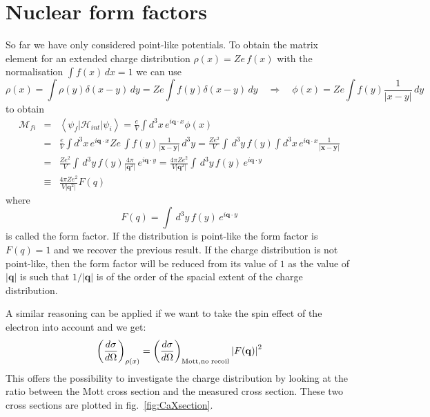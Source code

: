 \documentclass[12pt]{article}
\newcommand{\V}[1]{\mathbf{#1}}
\begin{document}
\section{Nuclear form factors}
So far we have only considered point-like potentials. To obtain the matrix element for an extended charge distribution $\rho(x)=Ze\,f(x)$ with the normalisation $\int f(x)\,dx=1$ we can use 
\[\rho(x)=\int \rho(y)\delta(x-y)\,dy=Ze\int f(y)\delta(x-y)\,dy\quad\Rightarrow \quad \phi(x)=Ze\int f(y)\frac{1}{|x-y|}\,dy \] 
to obtain 
\begin{eqnarray}
\mathcal{M}_{fi}&=&\left<\psi_f|\mathcal{H}_{int}|\psi_i\right>
=\frac{e}{V}\int d^3x\,e^{i\V{q}\cdot x}\phi(x)\nonumber\\
&=&
\frac{e}{V}\int d^3x\,e^{i\V{q}\cdot x}Ze\,\int f(y)\frac{1}{\left|\V{x}-\V{y}\right|}\,d^3y
=
\frac{Ze^2}{V}\int \,d^3y\,f(y)\int d^3x\,e^{i\V{q}\cdot x}\frac{1}{\left|\V{x}-\V{y}\right|}\nonumber\\
&=&
\frac{Ze^2}{V}\int \,d^3y\,f(y)\frac{4\pi}{|\V{q}^2|}\,e^{i\V{q}\cdot y}
=
\frac{4 \pi Z e^2}{V|\V{q}^2|}\int \,d^3y\,f(y)\,e^{i\V{q}\cdot y}\nonumber\\
&\equiv&\frac{4 \pi Ze^2}{V|\V{q}^2|}F(q)
\end{eqnarray}
where \[
F(q)=\int \,d^3y\,f(y)\,e^{i\V{q}\cdot y}
\] is called the form factor. If the distribution is point-like the form factor is $F(q)=1$ and we recover the previous result. If the charge distribution is not point-like, then the form factor will be reduced from its value of $1$ as the value of $|\V{q}|$ is such that $1/|\V{q}|$ is of the order of the spacial extent of the charge distribution. 

A similar reasoning can be applied if we want to take the spin effect of the electron into account and we get:
\[\left(\frac{d\sigma}{d\Omega}\right)_{\rho(x)}=\left(\frac{d\sigma}{d\Omega}\right)_{\rm{Mott,no\; recoil}}\left|F(\V{q})\right|^2\]   
This offers the possibility to investigate the charge distribution by looking at the ratio between the Mott cross section and the measured cross section. These two cross sections are plotted in fig.~\ref{fig:CaXsection}. 
 
\end{document}
